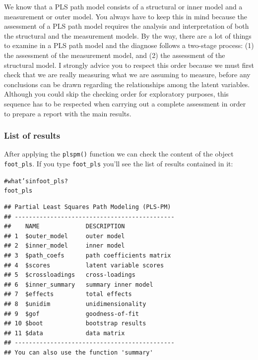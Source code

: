 \documentclass[12pt]{book}\usepackage{graphicx, color}
\makeatletter
\newcommand{\hlcomment}[1]{\textcolor[rgb]{0.180392156862745,0.6,0.341176470588235}{#1}}%
\newenvironment{kframe}{%
 \def\at@end@of@kframe{}%
 \ifinner\ifhmode%
  \def\at@end@of@kframe{\end{minipage}}%
  \begin{minipage}{\columnwidth}%
 \fi\fi%
 \def\FrameCommand##1{\hskip\@totalleftmargin \hskip-\fboxsep
 \colorbox{shadecolor}{##1}\hskip-\fboxsep
     \hskip-\linewidth \hskip-\@totalleftmargin \hskip\columnwidth}%
 \MakeFramed {\advance\hsize-\width
   \@totalleftmargin\z@ \linewidth\hsize
   \@setminipage}}%
 {\par\unskip\endMakeFramed%
 \at@end@of@kframe}
\newenvironment{knitrout}{}{} %
\newcommand{\fplspm}{\texttt{plspm()}}
\newcommand{\code}[1]{\texttt{#1}}
\makeatother
\begin{document}
We know that a PLS path model consists of a structural or inner model and a measurement or outer model. You always have to keep this in mind because the assessment of a PLS path model requires the analysis and interpretation of both the structural and the measurement models. By the way, there are a lot of things to examine in a PLS path model and the diagnose follows a two-stage process: (1) the assessment of the measurement model, and (2) the assessment of the structural model. I strongly advice you to respect this order because we must first check that we are really measuring what we are assuming to measure, before any conclusions can be drawn regarding the relationships among the latent variables. Although you could skip the checking order for exploratory purposes, this sequence has to be respected when carrying out a complete assessment in order to prepare a report with the main results. 

\subsubsection*{List of results}
After applying the \fplspm{} function we can check the content of the object \code{foot\_pls}. If you type \code{foot\_pls} you'll see the list of results contained in it:
\begin{knitrout}
\color{fgcolor}\begin{kframe}
\begin{alltt}
\hlcomment{# what's in foot_pls?}
foot_pls
\end{alltt}
\begin{verbatim}
## Partial Least Squares Path Modeling (PLS-PM) 
## ---------------------------------------------
##    NAME             DESCRIPTION
## 1  $outer_model     outer model
## 2  $inner_model     inner model
## 3  $path_coefs      path coefficients matrix
## 4  $scores          latent variable scores
## 5  $crossloadings   cross-loadings
## 6  $inner_summary   summary inner model
## 7  $effects         total effects
## 8  $unidim          unidimensionality
## 9  $gof             goodness-of-fit
## 10 $boot            bootstrap results
## 11 $data            data matrix
## ---------------------------------------------
## You can also use the function 'summary'
\end{verbatim}
\end{kframe}
\end{knitrout}
\end{document}
